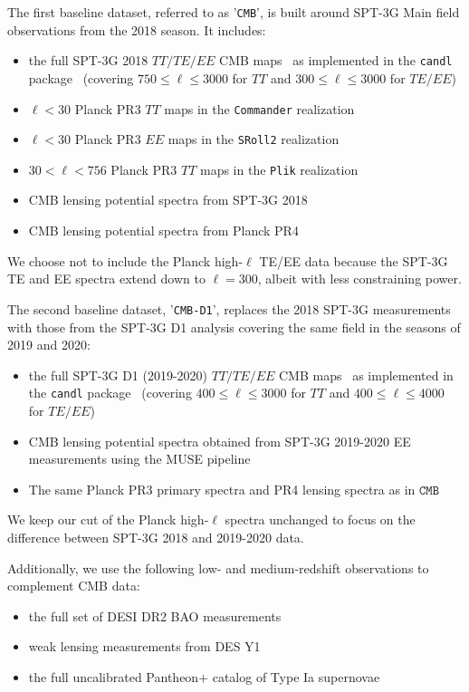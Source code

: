\documentclass[12pt,a4paper]{article}
\newcommand\?{/\hspace{0pt}}
\begin{document}
The first baseline dataset, referred to as '\texttt{CMB}', is built around SPT-3G Main field observations from the 2018 season. It includes:
\begin{itemize}
    \item the full SPT-3G 2018 $TT/TE/EE$ CMB maps~\cite{SPT-3G:2022hvq} as implemented in the \texttt{candl} package~\cite{Balkenhol:2024sbv} (covering $750\leq \ell\leq 3000$ for $TT$ and $300\leq \ell\leq 3000$ for $TE/EE$)
    \item $\ell<30$ Planck PR3 $TT$ maps in the \texttt{Commander} realization~\cite{Planck:2019nip}
    \item $\ell<30$ Planck PR3 $EE$ maps in the \texttt{SRoll2} realization~\cite{Delouis:2019bub}
    \item $30<\ell<756$ Planck PR3 $TT$ maps in the \texttt{Plik} realization~\cite{Planck:2019nip}
    \item CMB lensing potential spectra from  SPT-3G 2018~\cite{SPT:2023jql} 
    \item CMB lensing potential spectra from Planck PR4~\cite{Carron:2022eyg}
\end{itemize}
We choose not to include the Planck high-$\ell$ TE/EE data because the SPT-3G TE and EE spectra extend down to $\ell = 300$, albeit with less constraining power.

The second baseline dataset, '\texttt{CMB-D1}', replaces the 2018 SPT-3G measurements with those from the SPT-3G D1 analysis covering the same field in the seasons of 2019 and 2020:
\begin{itemize}
    \item the full SPT-3G D1 (2019-2020) $TT/TE/EE$ CMB maps~\cite{SPT-3G:2025bzu} as implemented in the \texttt{candl} package~\cite{Balkenhol:2024sbv} (covering $400\leq \ell\leq 3000$ for $TT$ and $400\leq \ell\leq 4000$ for $TE/EE$)
    \item CMB lensing potential spectra obtained from SPT-3G 2019-2020 EE measurements using the MUSE pipeline~\cite{SPT-3G:2024atg} 
    \item The same Planck PR3 primary spectra and PR4 lensing spectra as in $\texttt{CMB}$
\end{itemize}
We keep our cut of the Planck high-$\ell$ spectra unchanged to focus on the difference between SPT-3G 2018 and 2019-2020 data. %


Additionally, we use the following low- and medium-redshift observations to complement CMB data:
\begin{itemize}
\item the full set of DESI DR2 BAO measurements~\cite{DESI:2025zgx}
    \item weak lensing measurements from DES Y1~\cite{DES:2017myr}
    \item the full uncalibrated Pantheon+ catalog of Type Ia supernovae~\cite{Scolnic:2021amr}
\end{itemize}
\end{document}
